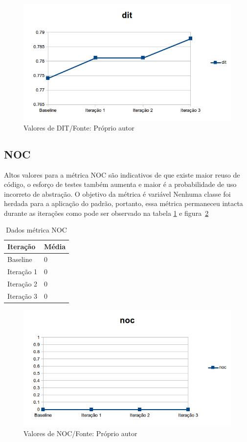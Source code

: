 \begin{figure}[h]
	\centering
	\includegraphics{img/dit.png}
	\caption{Valores de DIT/Fonte: Próprio autor}
	\label{fig:dit}
\end{figure}


\subsection{NOC}

Altos valores para a métrica NOC são indicativos de que existe maior reuso de
código, o esforço de testes também aumenta e maior é a probabilidade de uso
incorreto de abstração. O objetivo da métrica é variável Nenhuma classe foi
herdada para a aplicação do padrão, portanto, essa métrica permaneceu intacta
durante as iterações como pode ser observado na tabela \ref{tab:noc} e
figura~\ref{fig:noc}

\begin{table}[h]
	\centering
    \begin{tabular}{ | l | l | }
    \hline
    Iteração & Média 			\\ \hline
    Baseline & 0  	\\ \hline
    Iteração 1 & 0			\\ \hline
	Iteração 2 & 0				\\ \hline
	Iteração 3 & 0	\\ \hline
    \end{tabular}
    \caption{Dados métrica NOC}
    \label{tab:noc}
\end{table}

\begin{figure}[h]
	\centering
	\includegraphics{img/noc.png}
	\caption{Valores de NOC/Fonte: Próprio autor}
	\label{fig:noc}
\end{figure}

